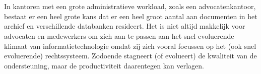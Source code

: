 
%
%
%
%
%

%



\chapter*{}

In kantoren met een grote administratieve workload, zoals een advocatenkantoor, bestaat er een heel grote kans dat er een heel groot aantal aan documenten 
in het archief en verschillende databanken resideert.  Het is niet altijd makkelijk voor advocaten en medewerkers om zich aan te passen aan het snel evoluerende klimaat van informatietechnologie omdat zij zich vooral 
focussen op het (ook snel evoluerende) rechtssysteem. Zodoende stagneert (of evolueert) de kwaliteit van de ondersteuning, maar de productiviteit daarentegen kan verlagen.  \\

